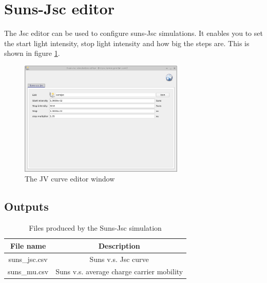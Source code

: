 \newpage
\section{Suns-Jsc editor}
The Jsc editor can be used to configure suns-Jsc simulations. It enables you to set the start light intensity, stop light intensity and how big the steps are. This is shown in figure \ref{fig:sunsjsceditor}.

\begin{figure}[H]
\centering
\includegraphics[width=0.7\textwidth,height=0.5\textwidth]{./images/sim_editors/suns_jsc_editor.png}
\caption{The JV curve editor window}
\label{fig:sunsjsceditor}
\end{figure}


\subsection{Outputs}

\begin{table}[H]
\begin{center}
\begin{tabular}{ |c|c| } 
 \hline
	File name 		& 	Description  \\ 
 \hline
	suns\_jsc.csv 	&	Suns v.s. Jsc curve \\ 
	suns\_mu.csv		&	Suns v.s. average charge carrier mobility \\ 
 \hline
\end{tabular}
\caption{Files produced by the Suns-Jsc simulation}
\label{tab:suns_jsc_output}
\end{center}
\end{table}

